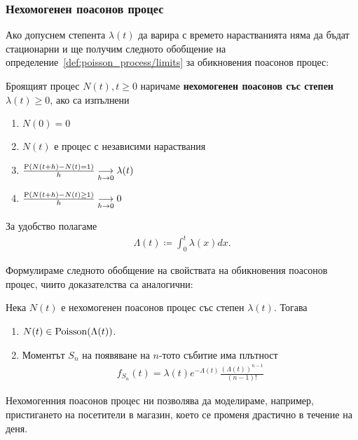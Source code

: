 \documentclass[numbers=endperiod, bibliography=totocnumbered]{scrartcl}
\begin{document}
\subsubsection{Нехомогенен поасонов процес}

Ако допуснем степента \( \lambda(t) \) да варира с времето нарастванията няма да бъдат стационарни и ще получим следното обобщение на определение~\ref{def:poisson_process/limits} за обикновения поасонов процес:
\begin{definition}
  Броящият процес \( N(t), t \geq 0 \) наричаме \textbf{нехомогенен поасонов със степен \( \lambda(t) \geq 0 \)}, ако са изпълнени
  \begin{enumerate}
    \item \( N(0) = 0 \)
    \item \( N(t) \) е процес с независими нараствания
    \item \( \frac {\Prob(N(t+h) - N(t) = 1)} h \Conv[h \to 0]{} \lambda(t) \)
    \item \( \frac {\Prob(N(t+h) - N(t) \geq 1)} h \Conv[h \to 0]{} 0 \)
  \end{enumerate}

  За удобство полагаме
  \begin{align*}
    \Lambda(t) \coloneqq \int_0^t \lambda(x) dx.
  \end{align*}
\end{definition}

Формулираме следното обобщение на свойствата на обикновения поасонов процес, чиито доказателства са аналогични:
\begin{theorem}
  Нека \( N(t) \) е нехомогенен поасонов процес със степен \( \lambda(t) \). Тогава
  \begin{enumerate}
    \item \( N(t) \in \DPoisson(\Lambda(t)) \).
    \item Моментът \( S_n \) на появяване на \( n \)-тото събитие има плътност
    \begin{align*}
      f_{S_n}(t) = \lambda(t) e^{-\Lambda(t)} \frac {{(\Lambda(t))}^{n-1}} {(n-1)!}
    \end{align*}
  \end{enumerate}
\end{theorem}

\begin{note}
  Нехомогенния поасонов процес ни позволява да моделираме, например, пристигането на посетители в магазин, което се променя драстично в течение на деня.
\end{note}

\printbibliography
\end{document}
